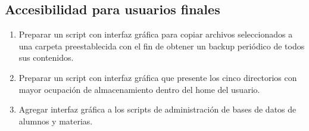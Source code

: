 \subsection{Accesibilidad para usuarios finales}
\begin{enumerate}
	\item 
Preparar un script con interfaz gráfica para copiar archivos seleccionados a una carpeta preestablecida con el fin de obtener un backup periódico de todos sus contenidos.
	\item 
Preparar un script con interfaz gráfica que presente los cinco directorios con mayor ocupación de almacenamiento dentro del home del usuario.
	\item 
Agregar interfaz gráfica a los scripts de administración de bases de datos de alumnos y materias.
\end{enumerate}


